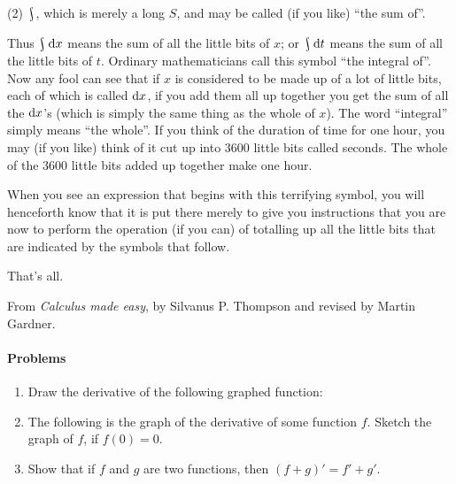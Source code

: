 (2) $ \rint $, which is merely a long $ S $, and may be called (if you like) ``the sum of''.

Thus $ \rint \dif{x} $ means the sum of all the little bits of $ x $; or $ \rint \dif{t} $ means
the sum of all the little bits of $ t $. Ordinary mathematicians call this symbol ``the integral of''.
Now any fool can see that if $ x $ is considered to be made up of a lot of little bits, each of
which is called $ \dif{x} $, if you add them all up together you get the sum of all the $ \dif{x}$'s (which
is simply the same thing as the whole of $ x $). The word ``integral'' simply means ``the whole''. If you think
of the duration of time for one hour, you may  (if you like) think of it cut up into 3600 little bits
called seconds. The whole of the 3600 little bits added up together make one hour.

When you see an expression that begins with this terrifying symbol, you will henceforth know that it is put
there merely to give you instructions that you are now to perform the operation (if you can) of totalling up
all the little bits that are indicated by the symbols that follow.

That's all.

\begin{flushright}
  From \textit{Calculus made easy}, by Silvanus P. Thompson and revised by Martin Gardner.
\end{flushright}

\paragraph{Problems}
\begin{enumerate}
  \item Draw the derivative of the following graphed function:
        \begin{center}
        \end{center}
  \item The following is the graph of the derivative of some function $ f $. Sketch the graph of $ f $, if $ f(0) = 0 $.
        \begin{center}
        \end{center}
  \item Show that if $ f $ and $ g $ are two functions, then $ (f + g)' = f' + g' $.
\end{enumerate}
